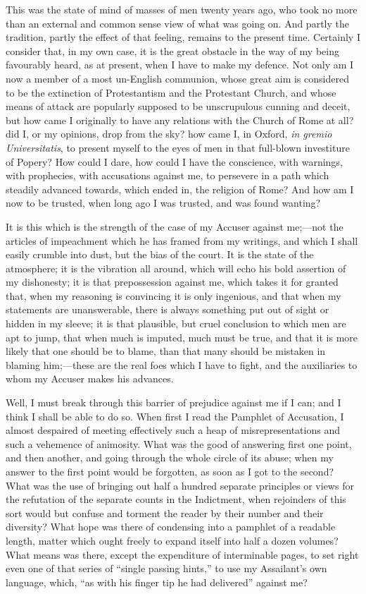 This was the state of mind of masses of men twenty years ago, who
took no more than an external and common sense view of what was going
on. And partly the tradition, partly the effect of that feeling,
remains to the present time. Certainly I consider that, in my own
case, it is the great obstacle in the way of my being favourably
heard, as at present, when I have to make my defence. Not only am
I now a member of a most un-English communion, whose great aim is
considered to be the extinction of Protestantism and the Protestant
Church, and whose means of attack are popularly supposed to be
unscrupulous cunning and deceit, but how came I originally
to have any relations with the Church of Rome at all? did I, or my
opinions, drop from the sky? how came I, in Oxford, \emph{in gremio
Universitatis}, to present myself to the eyes of men in that
full-blown investiture of Popery? How could I dare, how could I have
the conscience, with warnings, with prophecies, with accusations
against me, to persevere in a path which steadily advanced towards,
which ended in, the religion of Rome? And how am I now to be trusted,
when long ago I was trusted, and was found wanting?

It is this which is the strength of the case of my Accuser against
me;—not the articles
of impeachment which he has framed from my writings, and which I shall easily crumble into dust, but the bias of the
court. It is the state of the atmosphere; it is the vibration all
around, which will echo his bold
assertion of my dishonesty; it is that prepossession against me, which
takes it for granted that, when my reasoning is convincing it is only
ingenious, and that when my statements are unanswerable, there is
always something put
out of sight or hidden in my sleeve; it is that plausible, but cruel
conclusion to which men are apt to jump, that when much is
imputed, much must be true, and that it is more likely that one
should be to blame, than that many should be mistaken in blaming him;—these
are the real foes which I have to fight, and the auxiliaries to whom
my Accuser makes his advances.

Well, I must break through this barrier of prejudice against me
if I can; and I think I shall be able to do so. When first I read the
Pamphlet of Accusation, I almost despaired of meeting effectively such
a heap of misrepresentations
and such a vehemence of animosity. What was the good of answering
first one point, and then another, and going through the whole
circle of its abuse; when my answer to the first point would be
forgotten, as soon as I got to the second? What was the use of
bringing out half a hundred separate principles or views for the
refutation of the separate counts in the Indictment, when rejoinders
of this sort would but confuse and torment the reader by their number
and their diversity? What hope was there of condensing into a pamphlet
of a readable length, matter which ought freely to expand itself into
half a dozen volumes? What means was there, except the expenditure of
interminable pages, to set right even one of that series of
``single passing hints,'' to use my Assailant's own language,
which, ``as with his finger tip he had delivered'' against
me?

